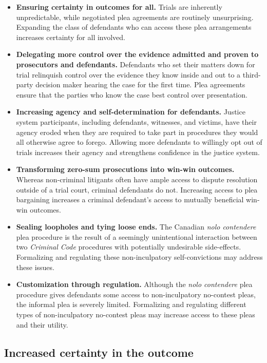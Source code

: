\begin{itemize}
    \item \textbf{Ensuring certainty in outcomes for all.} Trials are inherently unpredictable, while negotiated plea agreements are routinely unsurprising. Expanding the class of defendants who can access these plea arrangements increases certainty for all involved.
    \item \textbf{Delegating more control over the evidence admitted and proven to prosecutors and defendants.} Defendants who set their matters down for trial relinquish control over the evidence they know inside and out to a third-party decision maker hearing the case for the first time. Plea agreements ensure that the parties who know the case best control over presentation.
    \item \textbf{Increasing agency and self-determination for defendants.} Justice system participants, including defendants, witnesses, and victims, have their agency eroded when they are required to take part in procedures they would all otherwise agree to forego. Allowing more defendants to willingly opt out of trials increases their agency and strengthens confidence in the justice system.
    \item \textbf{Transforming zero-sum prosecutions into win-win outcomes.} Whereas non-criminal litigants often have ample access to dispute resolution outside of a trial court, criminal defendants do not. Increasing access to plea bargaining increases a criminal defendant's access to mutually beneficial win-win outcomes. 
    \item \textbf{Sealing loopholes and tying loose ends.} The Canadian \textit{nolo contendere} plea procedure is the result of a seemingly unintentional interaction between two \textit{Criminal Code} procedures with potentially undesirable side-effects. Formalizing and regulating these non-inculpatory self-convictions may address these issues.
    \item \textbf{Customization through regulation.} Although the \textit{nolo contendere} plea procedure gives defendants some access to non-inculpatory no-contest pleas, the informal plea is severely limited. Formalizing and regulating different types of non-inculpatory no-contest pleas may increase access to these pleas and their utility.
\end{itemize}

\subsection{Increased certainty in the outcome}

